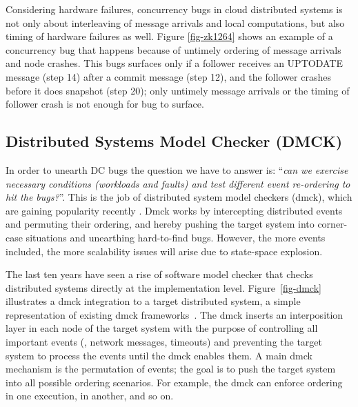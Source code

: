 Considering hardware failures, concurrency bugs in cloud distributed systems
is not only about interleaving of message arrivals and local computations, but
also timing of hardware failures as well. Figure \ref{fig-zk1264} shows an
example of a concurrency bug that happens because of untimely ordering of
message arrivals and node crashes. This bugs surfaces only if a follower
receives an UPTODATE message (step 14) after a commit message (step 12), and the
follower crashes before it does snapshot (step 20); only untimely message
arrivals or the timing of follower crash is not enough for bug to surface.

\subsection{Distributed Systems Model Checker (DMCK)}
\label{sec-bg-dmck}

In order to unearth DC bugs the question we have to answer is: ``{\em can we
exercise necessary conditions (\ie workloads and faults) and test different
event re-ordering to hit the bugs?}''. This is the job of distributed system
model checkers (dmck), which are gaining popularity recently
\cite{Guo+11-Demeter, Killian+07-LifeDeathMaceMC, Simsa+10-Dbug,
Yang+09-Modist}. Dmck works by intercepting distributed events and permuting
their ordering, and hereby pushing the target system into corner-case situations
and unearthing hard-to-find bugs. However, the more events included, the more
scalability issues will arise due to state-space explosion.


The last ten years have seen a rise of software model checker that checks
distributed systems directly at the implementation level.  Figure~\ref{fig-dmck}
illustrates a dmck integration to a target distributed system, a simple
representation of existing dmck frameworks~\cite{Guo+11-Demeter,
Killian+07-LifeDeathMaceMC, Simsa+10-Dbug, Yang+09-Modist}.  The dmck inserts an
interposition layer in each node of the target system with the purpose of
controlling all important events (\eg, network messages, timeouts) and
preventing the target system to process the events until the dmck enables them.
A main dmck mechanism is the permutation of events; the goal is to push the
target system into all possible ordering scenarios.  For example, the dmck can
enforce  ordering in one execution,  in another, and so on.

